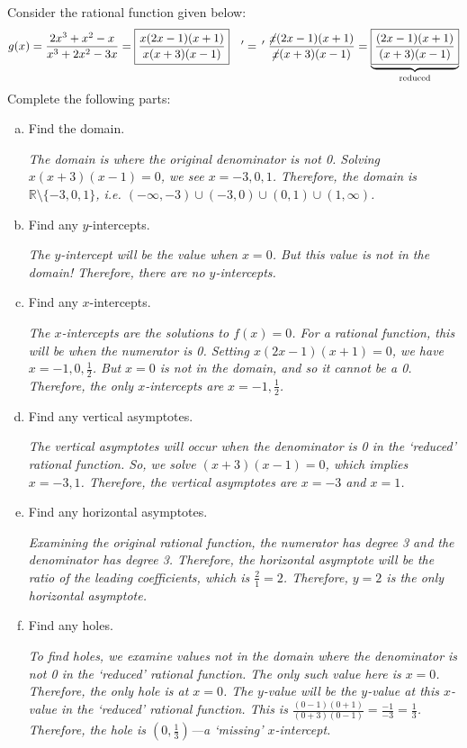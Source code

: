 \documentclass[11pt,letterpaper]{article}
\begin{document}
\newpage



 Consider the rational function given below:
	\[
	g(x)= \dfrac{2x^3 + x^2 - x}{x^3 + 2x^2 - 3x}= \boxed{\dfrac{x(2x - 1)(x + 1)}{x(x + 3)(x - 1)}} \quad '= \, ' \; \dfrac{\cancel{x}(2x - 1)(x + 1)}{\cancel{x}(x + 3)(x - 1)}= \underbrace{\boxed{\dfrac{(2x - 1)(x + 1)}{(x + 3)(x - 1)}}}_{\text{reduced}}
	\]
Complete the following parts:
	\begin{enumerate}[(a)]
	\item Find the domain. \par
	{\itshape The domain is where the original denominator is not 0. Solving $x(x + 3)(x - 1)= 0$, we see $x= -3, 0, 1$. Therefore, the domain is $\mathbb{R} \setminus \{ -3, 0, 1 \}$, i.e. $(-\infty, -3) \cup (-3, 0) \cup (0, 1) \cup (1, \infty)$.} \vfill
	
	\item Find any $y$-intercepts. \par
	{\itshape The $y$-intercept will be the value when $x= 0$. But this value is not in the domain! Therefore, there are no $y$-intercepts.} \vfill
	
	\item Find any $x$-intercepts. \par
	{\itshape The $x$-intercepts are the solutions to $f(x)= 0$. For a rational function, this will be when the numerator is 0. Setting $x(2x - 1)(x + 1)= 0$, we have $x= -1, 0, \tfrac{1}{2}$. But $x= 0$ is not in the domain, and so it cannot be a 0. Therefore, the only $x$-intercepts are $x= -1, \tfrac{1}{2}$.} \vfill
	
	\item Find any vertical asymptotes. \par
	{\itshape The vertical asymptotes will occur when the denominator is 0 in the `reduced' rational function. So, we solve $(x + 3)(x - 1)= 0$, which implies $x= -3, 1$. Therefore, the vertical asymptotes are $x= -3$ and $x= 1$.} \vfill
	
	\item Find any horizontal asymptotes. \par
	{\itshape Examining the original rational function, the numerator has degree 3 and the denominator has degree 3. Therefore, the horizontal asymptote will be the ratio of the leading coefficients, which is $\tfrac{2}{1}= 2$. Therefore, $y= 2$ is the only horizontal asymptote.} \vfill
	
	\item Find any holes. \par
	{\itshape To find holes, we examine values not in the domain where the denominator is not 0 in the `reduced' rational function. The only such value here is $x= 0$. Therefore, the only hole is at $x= 0$. The $y$-value will be the $y$-value at this $x$-value in the `reduced' rational function. This is $\tfrac{(0 - 1)(0 + 1)}{(0 + 3)(0 - 1)}= \tfrac{-1}{-3}= \tfrac{1}{3}$. Therefore, the hole is $(0, \tfrac{1}{3})$---a `missing' $x$-intercept.}
	\end{enumerate} \vfill
\end{document}
